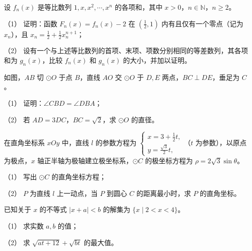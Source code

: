 \begin{question}

设 $f_n(x)$ 是等比数列 $1,x,x^2,\cdots,x^n$ 的各项和，其中 $x>0$，$n\in\mathbb N$，$n\geq2$。

（1） 证明：函数 $F_n(x)=f_n(x)-2$ 在 $(\frac12,1)$ 内有且仅有一个零点（记为 $x_n$），且 $x_n=\frac12+\frac12x_n^{n+1}$；

（2） 设有一个与上述等比数列的首项、末项、项数分别相同的等差数列，其各项和为 $g_n(x)$，比较 $f_n(x)$ 和 $g_n(x)$ 的大小，并加以证明。

\Needspace{0.4\textheight}
\end{question}
\begin{question}

如图，$AB$ 切 $\odot O$ 于点 $B$，直线 $AO$ 交 $\odot O$ 于 $D,E$ 两点，$BC\perp DE$，垂足为 $C$。

（1） 证明：$\angle CBD=\angle DBA$；

（2） 若 $AD=3DC$，$BC=\sqrt2$，求 $\odot O$ 的直径。
\nopagebreak[4]
\begin{center}\end{center}
\nopagebreak[4]
\end{question}
\begin{question}

在直角坐标系 $xOy$ 中，直线 $l$ 的参数方程为 $\begin{cases}x=3+\frac12t,\\y=\frac{\sqrt3}{2}t,\end{cases}$（$t$ 为参数），以原点为极点，$x$ 轴正半轴为极轴建立极坐标系，$\odot C$ 的极坐标方程为 $\rho=2\sqrt3\sin\theta$。

（1） 写出 $\odot C$ 的直角坐标方程；

（2） $P$ 为直线 $l$ 上一动点，当 $P$ 到圆心 $C$ 的距离最小时，求 $P$ 的直角坐标。

\end{question}
\begingroup
\renewenvironment{question}{\Needspace{0.08\textheight}}{}
\begin{question}

已知关于 $x$ 的不等式 $|x+a|<b$ 的解集为 $\{x\mid2<x<4\}$。

（1） 求实数 $a,b$ 的值；

（2） 求 $\sqrt{at+12}+\sqrt{bt}$ 的最大值。

\end{question}
\endgroup